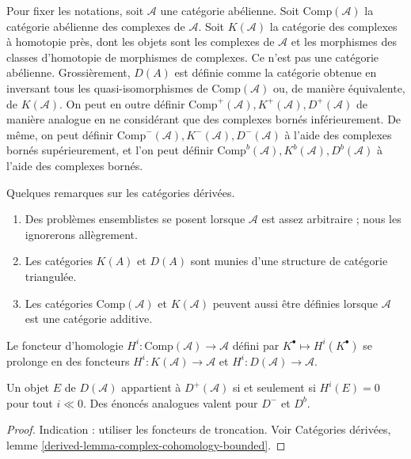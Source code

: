 \noindent
Pour fixer les notations, soit $\mathcal{A}$ une catégorie abélienne. Soit
$\text{Comp}(\mathcal{A})$ la catégorie abélienne des complexes de
$\mathcal{A}$. Soit $K(\mathcal{A})$ la catégorie des complexes à
homotopie près, dont les objets sont les complexes de $\mathcal{A}$ et les morphismes
des classes
d'homotopie de morphismes de complexes. Ce n'est pas une catégorie abélienne.
Grossièrement, $D(A)$ est définie comme la catégorie obtenue en inversant
tous les quasi-isomorphismes de $\text{Comp}(\mathcal{A})$ ou, de manière équivalente, de
$K(\mathcal{A})$. On peut en outre définir $\text{Comp}^+(\mathcal{A}),
K^+(\mathcal{A}), D^+(\mathcal{A})$ de manière analogue en ne considérant que des complexes bornés inférieurement.
De même, on peut définir $\text{Comp}^-(\mathcal{A}),
K^-(\mathcal{A}), D^-(\mathcal{A})$ à l'aide des complexes bornés supérieurement, et l'on peut
définir $\text{Comp}^b(\mathcal{A}), K^b(\mathcal{A}), D^b(\mathcal{A})$ à l'aide des
complexes bornés.

\begin{remark}
\label{remarks-derived-categories}
Quelques remarques sur les catégories dérivées.
\begin{enumerate}
\item
Des problèmes ensemblistes se posent lorsque $\mathcal{A}$ est assez
arbitraire ; nous les ignorerons allègrement.
\item
Les catégories $K(A)$ et $D(A)$ sont munies d'une structure de
catégorie triangulée.
\item
Les catégories $\text{Comp}(\mathcal{A})$ et $K(\mathcal{A})$ peuvent aussi être
définies lorsque $\mathcal{A}$ est une catégorie additive.
\end{enumerate}
\end{remark}

\noindent
Le foncteur d'homologie $H^i : \text{Comp}(\mathcal{A}) \to \mathcal{A}$ défini par
$K^\bullet \mapsto H^i(K^\bullet)$ se prolonge en des foncteurs $H^i :
K(\mathcal{A}) \to \mathcal{A}$ et $H^i : D(\mathcal{A}) \to \mathcal{A}$.

\begin{lemma}
\label{lemma-when-in-bounded}
Un objet $E$ de $D(\mathcal{A})$ appartient à $D^+(\mathcal{A})$ si et seulement
si $H^i(E) =0 $ pour tout $i \ll 0$. Des énoncés analogues valent pour $D^-$ et
$D^b$.
\end{lemma}

\begin{proof}
Indication : utiliser les foncteurs de troncation. Voir
Catégories dérivées, lemme \ref{derived-lemma-complex-cohomology-bounded}.
\end{proof}

